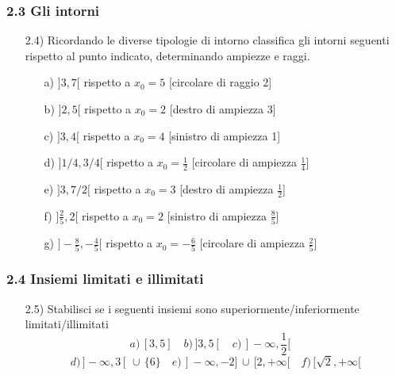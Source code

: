   \subsubsection*{2.3 Gli intorni}
  \begin{itemize}
  \item[2.4)] Ricordando le diverse tipologie di 
intorno classifica gli intorni seguenti rispetto al punto indicato, 
determinando ampiezze e raggi.
  \begin{itemize}
  \item[a)] $]3, 7[$ rispetto a 
$x_0=5$   \hfill   [circolare di raggio 2]
  \item[b)] $]2, 5[$ rispetto a 
$x_0=2$   \hfill  [destro di ampiezza 3]
  \item[c)] $]3, 4[$ rispetto a 
$x_0=4$  \hfill  [sinistro di ampiezza 1]
  \item[d)] $]1/4, 3/4[$ 
rispetto a $x_0=\frac{1}{2}$   \hfill  [circolare di ampiezza $\frac{1}{4}$]
  \item[e)] $]3, 7/2[$ rispetto 
a $x_0=3$   \hfill  [destro di ampiezza $\frac{1}{2}$] 
  \item[f)] $]\frac{2}{5}, 2[$ 
rispetto a $x_0=2$  \hfill   [sinistro di ampiezza $\frac{8}{5}$]
  \item[g)] $]-\frac{8}{5}, 
-\frac{4}{5}[$ rispetto a $x_0= -\frac{6}{5}$   \hfill [circolare di ampiezza 
$\frac{2}{5}$]
  \end{itemize}
  \end{itemize}
  \subsubsection*{2.4 Insiemi limitati e illimitati}
  \begin{itemize}
  \item[2.5)]  Stabilisci se i seguenti insiemi 
sono superiormente/inferiormente limitati/illimitati
$$a)\, [3, 5]  \,\,\, \,\,\,   b)\, ]3, 5[  \,\,\, \,\,\,   c)\, ]-\infty, 
\frac{1}{2}[   \,\,\, \,\,\,  $$ 
  $$d)\,]-\infty, 3[\,\cup\,\{6\}  \,\,\,\,\,\,  e)\,  ]-\infty, 
-2]\,\cup\,[2, +\infty[ \,\,\,\,\,\,  f)\, [\sqrt{2}, +\infty[$$
  \end{itemize}
